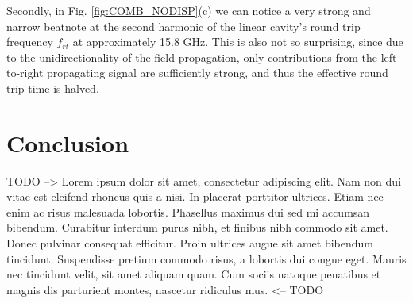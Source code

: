 \documentclass[journal]{IEEEtran}
\begin{document}
	
	Secondly, in Fig. \ref{fig:COMB_NODISP}(c) we can notice a very strong and narrow beatnote at the second harmonic of the linear cavity's round trip frequency $f_{rt}$ at approximately 15.8 GHz. This is also not so surprising, since due to the unidirectionality of the field propagation, only contributions from the left-to-right propagating signal are sufficiently strong, and thus the effective round trip time is halved.  
	\section{Conclusion}
	TODO --> Lorem ipsum dolor sit amet, consectetur adipiscing elit. Nam non dui vitae est eleifend rhoncus quis a nisi. In placerat porttitor ultrices. Etiam nec enim ac risus malesuada lobortis. Phasellus maximus dui sed mi accumsan bibendum. Curabitur interdum purus nibh, et finibus nibh commodo sit amet. Donec pulvinar consequat efficitur. Proin ultrices augue sit amet bibendum tincidunt. Suspendisse pretium commodo risus, a lobortis dui congue eget. Mauris nec tincidunt velit, sit amet aliquam quam. Cum sociis natoque penatibus et magnis dis parturient montes, nascetur ridiculus mus. <-- TODO

	
	
	
	
\end{document}
